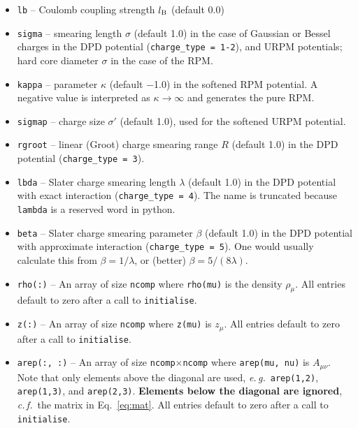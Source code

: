 \documentclass[12pt,a4paper]{article}
\newcommand{\latin}[1]{\emph{#1}}
\newcommand{\eg}{\latin{e.\,g.}}
\newcommand{\cf}{\latin{c.\,f.}}
\newcommand{\Eqref}[1]{Eq.~\eqref{#1}}
\begin{document}
\begin{itemize}
%
\item\verb+lb+ -- Coulomb coupling strength $l_{\mathrm{B}}$ (default 0.0)
%
\item\verb+sigma+ -- smearing length $\sigma$ (default 1.0) in the
  case of Gaussian or Bessel charges in the DPD potential
  (\verb+charge_type = 1-2+), and URPM potentials; hard core diameter
  $\sigma$ in the case of the RPM.
%
\item\verb+kappa+ -- parameter $\kappa$ (default $-$1.0) in the
  softened RPM potential.  A negative value is interpreted as
  $\kappa\to\infty$ and generates the pure RPM.
%
\item\verb+sigmap+ -- charge size $\sigma'$ (default 1.0), used for
  the softened URPM potential.
%
\item\verb+rgroot+ -- linear (Groot) charge smearing range $R$
  (default 1.0) in the DPD potential (\verb+charge_type = 3+).
%
\item\verb+lbda+ -- Slater charge smearing length $\lambda$ (default
  1.0) in the DPD potential with exact interaction
  (\verb+charge_type = 4+).  The name is truncated because
  \verb+lambda+ is a reserved word in python.
%
\item\verb+beta+ -- Slater charge smearing parameter $\beta$
  (default 1.0) in the DPD potential with approximate interaction
  (\verb+charge_type = 5+).  One would usually calculate this from
  $\beta=1/\lambda$, or (better) $\beta=5/(8\lambda)$.
%
\item\verb+rho(:)+ -- An array of size \verb+ncomp+ where
  \verb+rho(mu)+ is the density $\rho_\mu$.  All entries default to
  zero after a call to \verb+initialise+.
%
\item\verb+z(:)+ -- An array of size \verb+ncomp+ where
  \verb+z(mu)+ is $z_\mu$.  All entries default to
  zero after a call to \verb+initialise+.
%
\item\verb+arep(:, :)+ -- An array of size
  \verb+ncomp+$\times$\verb+ncomp+ where \verb+arep(mu, nu)+ is
  $A_{\mu\nu}$.  Note that only elements above the diagonal are used,
  \eg\ \verb+arep(1,2)+, \verb+arep(1,3)+, and \verb+arep(2,3)+.  {\bf
    Elements below the diagonal are ignored}, \cf\ the matrix in
  \Eqref{eq:mat}.  All entries default to zero after a call to
    \verb+initialise+.
%
\end{itemize}
\end{document}

